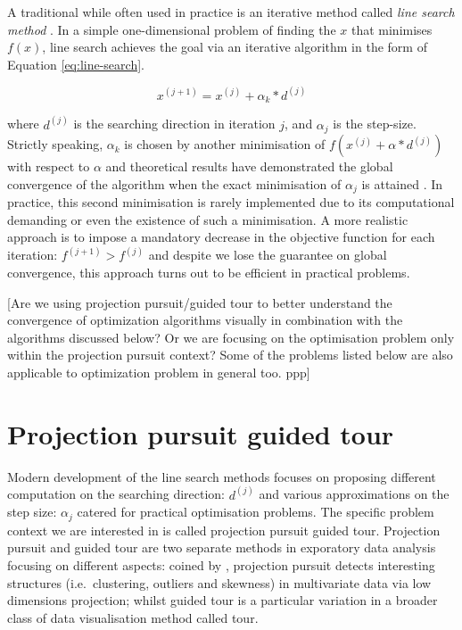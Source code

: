 \documentclass[12pt]{article}
\begin{document}
A traditional while often used in practice is an iterative method called \emph{line search method} \citep{fletcher2013practical}. In a simple one-dimensional problem of finding the \(x\) that minimises \(f(x)\), line search achieves the goal via an iterative algorithm in the form of Equation \ref{eq:line-search}.

\begin{equation}
x^{(j + 1)} = x^{(j)} + \alpha_k* d^{(j)}
\label{eq:line-search}
\end{equation}

where \(d^{(j)}\) is the searching direction in iteration \(j\), and \(\alpha_j\) is the step-size. Strictly speaking, \(\alpha_k\) is chosen by another minimisation of \(f(x^{(j)} + \alpha* d^{(j)})\) with respect to \(\alpha\) and theoretical results have demonstrated the global convergence of the algorithm when the exact minimisation of \(\alpha_j\) is attained \citep{curry1944method}. In practice, this second minimisation is rarely implemented due to its computational demanding or even the existence of such a minimisation. A more realistic approach is to impose a mandatory decrease in the objective function for each iteration: \(f^{(j+1)}> f^{(j)}\) and despite we lose the guarantee on global convergence, this approach turns out to be efficient in practical problems.

{[}Are we using projection pursuit/guided tour to better understand the convergence of optimization algorithms visually in combination with the algorithms discussed below? Or we are focusing on the optimisation problem only within the projection pursuit context? Some of the problems listed below are also applicable to optimization problem in general too. ppp{]}

\hypertarget{tour}{%
\section{Projection pursuit guided tour}\label{tour}}

Modern development of the line search methods focuses on proposing different computation on the searching direction: \(d^{(j)}\) and various approximations on the step size: \(\alpha_j\) catered for practical optimisation problems. The specific problem context we are interested in is called projection pursuit guided tour.
Projection pursuit and guided tour are two separate methods in exporatory data analysis focusing on different aspects: coined by \citet{friedman1974projection}, projection pursuit detects interesting structures (i.e.~clustering, outliers and skewness) in multivariate data via low dimensions projection; whilst guided tour is a particular variation in a broader class of data visualisation method called tour.
\end{document}
